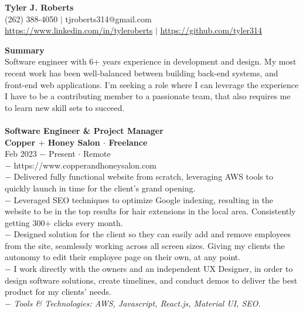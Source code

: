 \documentclass{resume}
\begin{document}
\begin{center}
{\LARGE \bf Tyler J. Roberts} \\[1mm]
\footnotesize
(262) 388-4050 $|$
tjroberts314@gmail.com \\[1mm]
\href{https://www.linkedin.com/in/tyleroberts}{https://www.linkedin.com/in/tyleroberts} $|$
\href{https://github.com/tyler314}{https://github.com/tyler314}
\end{center}
\begin{flushleft}

{\textbf{\large Summary}} \\
{
\scriptsize
\tab Software engineer with 6+ years experience in  development and design. My most recent work has been well-balanced between building back-end systems, and front-end  web applications. I'm seeking a role where I can leverage the experience I have to be a contributing member to a passionate team, that also requires me to learn new skill sets to succeed.
\\[4mm]
}
\\[2mm]

\normalsize{\bf Software Engineer \& Project Manager}\\
\footnotesize{\bf Copper $+$ Honey Salon $\cdot$ Freelance}\\
\footnotesize{Feb 2023 $-$ Present $\cdot$ Remote}\\[1mm]
{\scriptsize
	$-$ https://www.copperandhoneysalon.com\\
	$-$ Delivered fully functional website from scratch, leveraging AWS tools to quickly launch in time for the client's grand opening.\\
	$-$ Leveraged SEO techniques to optimize Google indexing, resulting in the website to be in the top results for hair extensions in the local area. Consistently getting 300$+$ clicks every month.\\
	$-$ Designed solution for the client so they can easily add and remove employees from the site, seamlessly working across all screen sizes. Giving my clients the autonomy to edit their employee page on their own, at any point.\\
	$-$ I work directly with the owners and an independent UX Designer, in order to design software solutions, create timelines, and conduct demos to deliver the best product for my clients' needs.\\
	$-$ \textit{Tools \& Technologies: AWS, Javascript, React.js, Material UI, SEO.}
}\\[3mm]


\end{flushleft}
\end{document}
